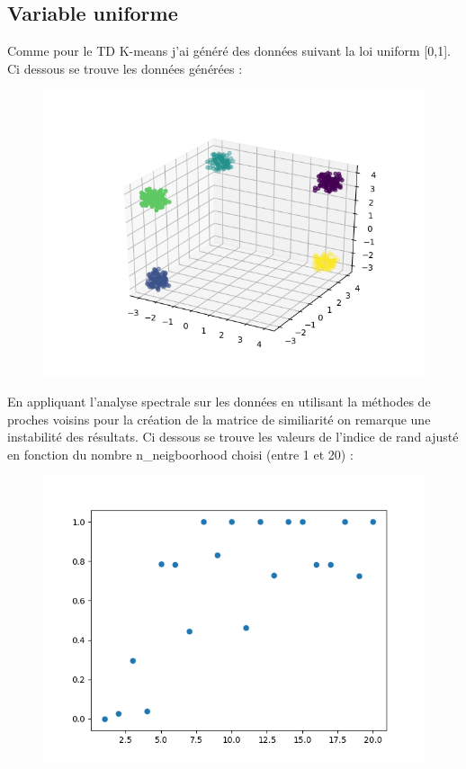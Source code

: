 \documentclass[12pt]{scrartcl} %
\begin{document}
\subsection{Variable uniforme}
Comme pour le TD K-means j'ai généré des données suivant la loi uniform  [0,1]. Ci dessous se trouve les données générées : 
\newline
\begin{figure}[!h]
 \centering 
\includegraphics[scale=.5]{unifSpectrale.png}
\end{figure}
\newline 
En appliquant l'analyse spectrale sur les données en utilisant la méthodes de proches voisins pour la création de la matrice de similiarité on remarque une instabilité des résultats. Ci dessous se trouve les valeurs de l'indice de rand ajusté en fonction du nombre n\_neigboorhood choisi (entre 1 et 20) : 
\newline
\begin{figure}[!h]
 \centering 
\includegraphics[scale=.5]{spectralUnifNN.png}
\end{figure}
\end{document}
